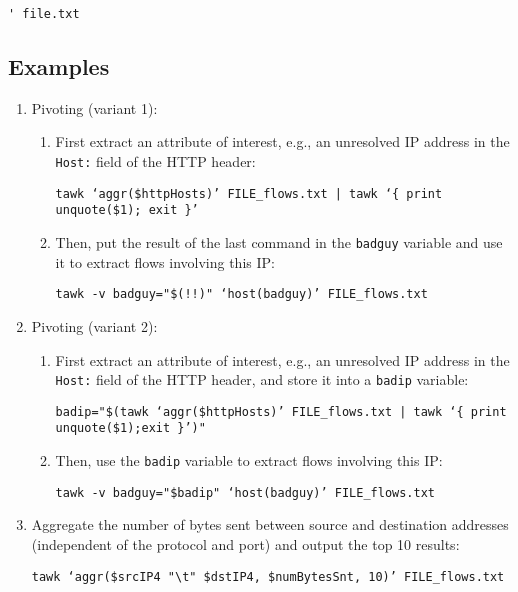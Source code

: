 \documentclass[documentation]{subfiles}
\begin{document}
\begin{itemize}
\begin{itemize}
\begin{verbatim}
' file.txt
\end{verbatim}
        \end{itemize}
\end{itemize}

\subsection{Examples}
\begin{enumerate}
    \item Pivoting (variant 1):
        \begin{enumerate}
            \item First extract an attribute of interest, e.g., an unresolved IP address in the {\tt Host:} field of the HTTP header:
                \begin{center}{\tt tawk `aggr(\$httpHosts)' FILE\_flows.txt | tawk `\{ print unquote(\$1); exit \}'}\end{center}
                \item Then, put the result of the last command in the {\tt badguy} variable and use it to extract flows involving this IP:
                \begin{center}{\tt tawk -v badguy="\$(!!)" `host(badguy)' FILE\_flows.txt}\end{center}
        \end{enumerate}
    \item Pivoting (variant 2):
        \begin{enumerate}
            \item First extract an attribute of interest, e.g., an unresolved IP address in the {\tt Host:} field of the HTTP header, and store it into a {\tt badip} variable:
                \begin{center}{\tt badip="\$(tawk `aggr(\$httpHosts)' FILE\_flows.txt | tawk `\{ print unquote(\$1);exit \}')"}\end{center}
            \item Then, use the {\tt badip} variable to extract flows involving this IP:
                \begin{center}{\tt tawk -v badguy="\$badip" `host(badguy)' FILE\_flows.txt}\end{center}
        \end{enumerate}
    \item Aggregate the number of bytes sent between source and destination addresses (independent of the protocol and port) and output the top 10 results:
        \begin{center}{\tt tawk `aggr(\$srcIP4 "\textbackslash{}t" \$dstIP4, \$numBytesSnt, 10)' FILE\_flows.txt}\end{center}

\end{enumerate}
\end{document}
